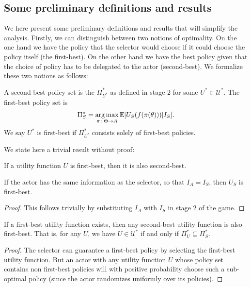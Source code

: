 \subsection{Some preliminary definitions and results}\label{sec:model:preliminaries}
We here present some preliminary definitions and results that will simplify the analysis. Firstly, we can distinguish between two notions of optimality. On the one hand we have the policy that the selector would choose if it could choose the policy itself (the first-best). On the other hand we have the best policy given that the choice of policy has to be delegated to the actor (second-best). We formalize these two notions as follows:

\begin{definition}
	A second-best policy set is the $\Pi^*_{U^*}$ as defined in stage $2$ for some $U^*\in\mathcal U^*$. The first-best policy set is \[\Pi_S^*= \operatorname*{arg\,max}\limits_{\pi\colon \Theta\to A}\mathbb E[U_S(f(\pi(\theta)))|I_S].\] We say $U^*$ is first-best if $\Pi^*_{U^*}$ consists solely of first-best policies.
\end{definition}
We state here a trivial result without proof:
\begin{lemma}\label{lemma:firstbestimpliessecondbest}
	If a utility function $U$ is first-best, then it is also second-best.
\end{lemma}
\begin{lemma}\label{lemma:KAequalsTimpliesUSoptimal}
	If the actor has the same information as the selector, so that $I_A=I_S$, then $U_S$ is first-best.
\end{lemma}

\begin{proof}
	This follows trivially by substituting $I_A$ with $I_S$ in stage $2$ of the game.
\end{proof}


\newcommand{\lemmafirstbestpolicysetcondition
}{If a first-best utility function exists, then any second-best utility function is also first-best. That is, for any $U$, we have $U\in \mathcal U^*$ if and only if $\Pi^*_U\subseteq \Pi_S^*$.}
\begin{lemma}\label{lemma:firstbestpolicysetcondition}
	\lemmafirstbestpolicysetcondition
\end{lemma}
\begin{proof}
	The selector can guarantee a first-best policy by selecting the first-best utility function. But an actor with any utility function $U$ whose policy set contains non first-best policies will with positive probability choose such a sub-optimal policy (since the actor randomizes uniformly over its policies). 
\end{proof}




